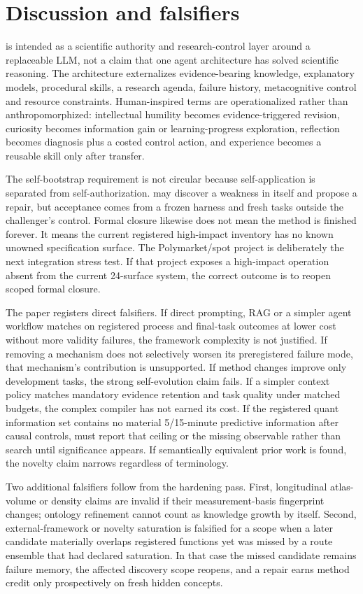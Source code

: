 \section{Discussion and falsifiers}
\RAKL{} is intended as a scientific authority and research-control layer around a replaceable LLM, not a claim that one agent architecture has solved scientific reasoning. The architecture externalizes evidence-bearing knowledge, explanatory models, procedural skills, a research agenda, failure history, metacognitive control and resource constraints. Human-inspired terms are operationalized rather than anthropomorphized: intellectual humility becomes evidence-triggered revision, curiosity becomes information gain or learning-progress exploration, reflection becomes diagnosis plus a costed control action, and experience becomes a reusable skill only after transfer.

The self-bootstrap requirement is not circular because self-application is separated from self-authorization. \RAKL{} may discover a weakness in itself and propose a repair, but acceptance comes from a frozen harness and fresh tasks outside the challenger's control. Formal closure likewise does not mean the method is finished forever. It means the current registered high-impact inventory has no known unowned specification surface. The Polymarket/spot project is deliberately the next integration stress test. If that project exposes a high-impact operation absent from the current 24-surface system, the correct outcome is to reopen scoped formal closure.

The paper registers direct falsifiers. If direct prompting, RAG or a simpler agent workflow matches \RAKL{} on registered process and final-task outcomes at lower cost without more validity failures, the framework complexity is not justified. If removing a mechanism does not selectively worsen its preregistered failure mode, that mechanism's contribution is unsupported. If method changes improve only development tasks, the strong self-evolution claim fails. If a simpler context policy matches mandatory evidence retention and task quality under matched budgets, the complex compiler has not earned its cost. If the registered quant information set contains no material 5/15-minute predictive information after causal controls, \RAKL{} must report that ceiling or the missing observable rather than search until significance appears. If semantically equivalent prior work is found, the novelty claim narrows regardless of terminology.


Two additional falsifiers follow from the hardening pass. First, longitudinal atlas-volume or density claims are invalid if their measurement-basis fingerprint changes; ontology refinement cannot count as knowledge growth by itself. Second, external-framework or novelty saturation is falsified for a scope when a later candidate materially overlaps registered functions yet was missed by a route ensemble that had declared saturation. In that case the missed candidate remains failure memory, the affected discovery scope reopens, and a repair earns method credit only prospectively on fresh hidden concepts.

